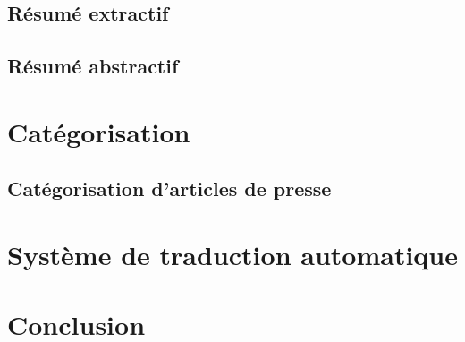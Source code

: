 \documentclass{report}
\begin{document}
    \subsection{Résumé extractif}

    \subsection{Résumé abstractif}


\section{Catégorisation}
    \subsection{Catégorisation d'articles de presse}


\section{Système de traduction automatique}


\section{Conclusion}


\Large


\end{document}
